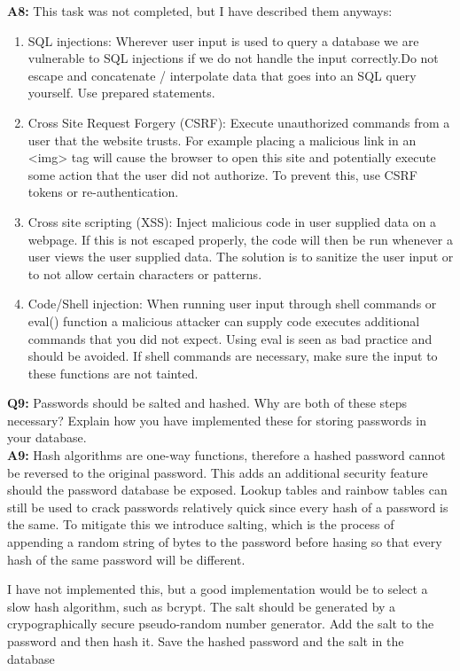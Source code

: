 \documentclass[paper=a4, fontsize=11pt]{article}
\begin{document}
    \textbf{A8:} This task was not completed, but I have described them
    anyways:
    \begin{enumerate}
        \item SQL injections: Wherever user input is used to query a database
            we are vulnerable to SQL injections if we do not handle the input
            correctly.Do not escape and concatenate / interpolate data
            that goes into an SQL query yourself. Use prepared statements.
        \item Cross Site Request Forgery (CSRF): Execute unauthorized commands
            from a user that the website trusts. For example placing a
            malicious link in an <img> tag will cause the browser to open this
            site and potentially execute some action that the user did not
            authorize. To prevent this, use CSRF tokens or re-authentication.
        \item Cross site scripting (XSS): Inject malicious code in user
            supplied data on a webpage. If this is not escaped properly, the
            code will then be run whenever a user views the user supplied data.
            The solution is to sanitize the user input or to not allow certain
            characters or patterns.
        \item Code/Shell injection: When running user input through shell
            commands or eval() function a malicious attacker can supply code
            executes additional commands that you did not expect. Using eval is
            seen as bad practice and should be avoided. If shell commands are
            necessary, make sure the input to these functions are not tainted.

    \end{enumerate}

    \textbf{Q9:} Passwords should be salted and hashed. Why are both of these
    steps necessary? Explain how you have implemented these for storing
    passwords in your database.\\

    \textbf{A9:} Hash algorithms are one-way functions, therefore a hashed
    password cannot be reversed to the original password. This adds an
    additional security feature should the password database be exposed.
    Lookup tables and rainbow tables can still be used to crack passwords
    relatively quick since every hash of a password is the same. To mitigate
    this we introduce salting, which is the process of appending a random
    string of bytes to the password before hasing so that every hash of the
    same password will be different.

    I have not implemented this, but a good implementation would be to select a
    slow hash algorithm, such as bcrypt. The salt should be generated by a
    crypographically secure pseudo-random number generator. Add the salt to the
    password and then hash it. Save the hashed password and the salt in the
    database

    
    
\end{document}
